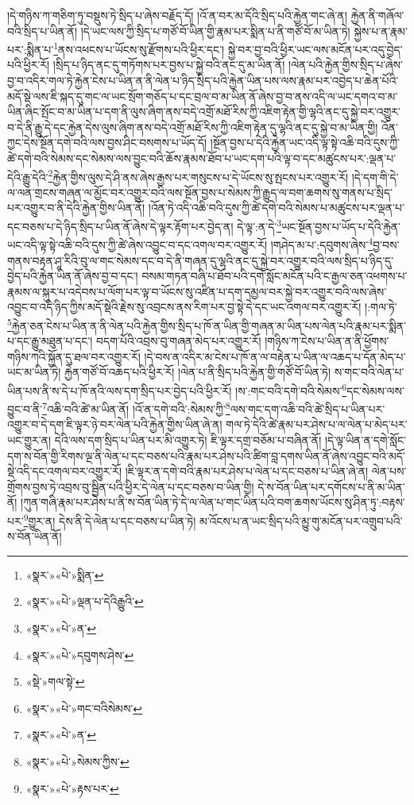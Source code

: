 །དེ་གཉིས་ཀ་གཅིག་ཏུ་བསྡུས་ཏེ་སྲིད་པ་ཞེས་བརྗོད་དོ། །འོ་ན་བར་མ་དོའི་སྲིད་པའི་རྐྱེན་གང་ཞེ་ན། རྐྱེན་ནི་གཞོལ་བའི་སྲིད་པ་ཡིན་ནོ། །དེ་ཡང་ལས་ཀྱི་སྲིད་པ་གཙོ་བོ་ཡིན་གྱི་རྣམ་པར་སྨིན་པ་ནི་གཙོ་བོ་མ་ཡིན་ཏེ། སྐྱེས་པ་ན་རྣམ་པར་:སྨིན་པ་\footnote{«སྣར་»«པེ་»སྨིན་}ནས་འཕངས་པ་ཡོངས་སུ་རྫོགས་པའི་ཕྱིར་དང་། སྐྱེ་བར་བྱ་བའི་ཕྱིར་ཡང་ལས་མངོན་པར་འདུ་བྱེད་པའི་ཕྱིར་རོ། །སྲིད་པ་ཉིད་ནང་དུ་གཏོགས་པར་བྱས་པ་སྐྱེ་བའི་ནང་དུ་མ་ཡིན་ནོ། །ལེན་པའི་རྐྱེན་གྱིས་སྲིད་པ་ཞེས་བྱ་བ་འདིར་གལ་ཏེ་རྐྱེན་ངེས་པ་ཡིན་ན་ནི་ལེན་པ་ཉིད་སྲིད་པའི་རྐྱེན་ཡིན་པས་ལས་རྣམ་པར་འབྱེད་པ་ཆེན་པོའི་མདོ་སྡེ་ལས་ཇི་སྐད་དུ་གང་ལ་ཡང་སྲོག་གཅོད་པ་དང་བྲལ་བ་མ་ཡིན་ནོ་ཞེས་བྱ་བ་ནས་འདི་ལ་ཡང་དགའ་བ་མ་ཡིན་ཞིང་སྤོང་བ་མ་ཡིན་པ་དག་ནི་ལུས་ཞིག་ནས་བདེ་འགྲོ་མཐོ་རིས་ཀྱི་འཇིག་རྟེན་གྱི་ལྷའི་ནང་དུ་སྐྱེ་བར་འགྱུར་བ་དེ་ནི་རྒྱུ་དེ་དང་རྐྱེན་དེས་ལུས་ཞིག་ནས་བདེ་འགྲོ་མཐོ་རིས་ཀྱི་འཇིག་རྟེན་དུ་ལྷའི་ནང་དུ་སྐྱེ་བ་མ་ཡིན་གྱི། འོན་ཀྱང་དེས་སྔོན་དགེ་བའི་ལས་བྱས་ཤིང་བསགས་པ་ཡོད་དོ། །སྔོན་བྱས་པ་དེའི་རྐྱེན་ཡང་འདི་ལྟ་སྟེ་འཆི་བའི་དུས་ཀྱི་ཚེ་དགེ་བའི་སེམས་དང་སེམས་ལས་བྱུང་བའི་ཆོས་རྣམས་ཐོབ་པ་ཡང་དག་པའི་ལྟ་བ་དང་མཚུངས་པར་:ལྡན་པ་དེའི་རྒྱུ་དེའི་\footnote{«སྣར་»«པེ་»ལྡན་པ་དེའིརྒྱུའི་}རྐྱེན་གྱིས་ལུས་དེ་ཤི་ནས་ཞེས་རྒྱས་པར་གསུངས་པ་དེ་ཡོངས་སུ་སྤངས་པར་འགྱུར་རོ། །དེ་དག་གི་དེ་ལ་ལན་གྲངས་གཞན་ལ་མྱོང་བར་འགྱུར་བའི་ལས་སྔོན་བྱས་པ་སེམས་ཀྱི་རྒྱུད་ལ་བག་ཆགས་སུ་གནས་པ་སྲིད་པར་འགྱུར་བ་ནི་དེའི་རྐྱེན་གྱིས་ཡིན་ནོ། །འོན་ཏེ་འདི་འཆི་བའི་དུས་ཀྱི་ཚེ་དགེ་བའི་སེམས་པ་མཚུངས་པར་ལྡན་པ་དང་བཅས་པ་དེ་ཉིད་སྲིད་པ་ཡིན་ནོ་ཞེས་དེ་ལྟར་རྟོག་པར་བྱེད་ན། དེ་ལྟ་:ན་དེ་\footnote{«སྣར་»«པེ་»ན་}ཡང་སྔོན་བྱས་པ་ཡོད་པ་དེའི་རྐྱེན་ཡང་འདི་ལྟ་སྟེ་འཆི་བའི་དུས་ཀྱི་ཚེ་ཞེས་འབྱུང་བ་དང་འགལ་བར་འགྱུར་རོ། །གཤེད་མ་པ་:དབུགས་ཞེས་\footnote{«སྣར་»«པེ་»དབུགས་ཤེས་}བྱ་བས་གནས་བརྟན་ཤཱ་རིའི་བུ་ལ་གང་སེམས་དང་བ་དེ་ནི་གཞན་དུ་ལྷའི་ནང་དུ་སྐྱེ་བར་འགྱུར་བའི་ལས་སྲིད་པ་ཉིད་དུ་བྱེད་པའི་རྐྱེན་ཡིན་ནོ་ཞེས་བྱ་བ་དང་། བསམ་གཏན་བཞི་པ་ཐོབ་པའི་དགེ་སློང་མངོན་པའི་ང་རྒྱལ་ཅན་འཕགས་པ་རྣམས་ལ་སྐུར་པ་འདེབས་པ་ལོག་པར་ལྟ་བ་ཡོངས་སུ་འཛིན་པ་དག་དམྱལ་བར་སྐྱེ་བར་འགྱུར་བའི་ལས་ཞེས་འབྱུང་བ་འདི་ཉིད་ཀྱིས་མདོ་སྡེའི་རྗེས་སུ་འབྲངས་ནས་རིག་པར་བྱ་སྟེ་དེ་དང་ཡང་འགལ་བར་འགྱུར་རོ། །:གལ་ཏེ་\footnote{«སྡེ་»གལ་སྟེ་}རྐྱེན་ཅན་ངེས་པ་ཡིན་ན་ནི་ལེན་པའི་རྐྱེན་གྱིས་སྲིད་པ་ཁོ་ན་ཡིན་གྱི་གཞན་མ་ཡིན་པས་ལེན་པའི་རྣམ་པར་སྨིན་པ་དང་རྒྱུ་མཐུན་པ་དང་། བདག་པོའི་འབྲས་བུ་གཞན་མེད་པར་འགྱུར་རོ། །གཉིས་ཀ་ངེས་པ་ཡིན་ན་ནི་ཕྱོགས་གཉིས་ཀའི་སྐྱོན་དུ་ཐལ་བར་འགྱུར་རོ། །དེ་བས་ན་འདིར་མ་ངེས་པ་ཁོ་ན་ལ་བརྟེན་པ་ཡིན་ལ་འཆད་པ་དོན་མེད་པ་ཡང་མ་ཡིན་ཏེ། རྐྱེན་གཙོ་བོ་འཆད་པའི་ཕྱིར་རོ། །ལེན་པ་ནི་སྲིད་པའི་རྐྱེན་གྱི་གཙོ་བོ་ཡིན་ཏེ། ས་གང་བའི་ལེན་པ་ཡིན་པས་ནི་ས་དེ་པ་ཁོ་ནའི་ལས་དག་སྲིད་པར་བྱེད་པའི་ཕྱིར་རོ། །ས་:གང་བའི་དགེ་བའི་སེམས་\footnote{«སྣར་»«པེ་»གང་བའིསེམས་}དང་སེམས་ལས་བྱུང་བ་ནི་\footnote{«སྣར་»«པེ་»ན་}འཆི་བའི་ཚེ་མ་ཡིན་ནོ། །འོ་ན་དགེ་བའི་:སེམས་ཀྱི་\footnote{«སྣར་»«པེ་»སེམས་ཀྱིས་}ལས་གང་དག་འཆི་བའི་ཚེ་སྲིད་པ་ཡིན་པར་འགྱུར་བ་དེ་དག་ཇི་ལྟར་ཉེ་བར་ལེན་པའི་རྐྱེན་གྱིས་ཡིན་ཞེ་ན། གལ་ཏེ་དེའི་ཚེ་རྣམ་པར་ཤེས་པ་ལ་ལེན་པ་མེད་པར་ཡང་གྱུར་ན། དེའི་ལས་དག་སྲིད་པ་ཡིན་པར་མི་འགྱུར་ཏེ། ཇི་ལྟར་དགྲ་བཅོམ་པ་བཞིན་ནོ། །དེ་ལྟ་ཡིན་ན་དགེ་སློང་དག་ས་བོན་གྱི་རིགས་ལྔ་ནི་ལེན་པ་དང་བཅས་པའི་རྣམ་པར་ཤེས་པའི་ཚིག་བླ་དགས་ཡིན་ནོ་ཞེས་འབྱུང་བའི་མདོ་སྡེ་འདི་དང་འགལ་བར་འགྱུར་རོ། །ཇི་ལྟར་ན་དགེ་བའི་རྣམ་པར་ཤེས་པ་ལེན་པ་དང་བཅས་པ་ཡིན་ཞེ་ན། ལེན་པས་གྲོགས་བྱས་ཏེ་འབྲས་བུ་སྦྱིན་པའི་ཕྱིར་དེ་ལེན་པ་དང་བཅས་བ་ཡིན་གྱི། དེ་ས་བོན་ཡིན་པར་དགོངས་པ་ནི་མ་ཡིན་ནོ། །ཀུན་གཞི་རྣམ་པར་ཤེས་པ་ནི་ས་བོན་ཡིན་ཏེ་དེ་ལ་ལེན་པ་གང་ཡིན་པའི་བག་ཆགས་ཡོངས་སུ་ཤིན་ཏུ་:བརྟས་པར་\footnote{«སྣར་»«པེ་»རྟས་པར་}གྱུར་ན། དེས་ནི་དེ་ལེན་པ་དང་བཅས་པ་ཡིན་ཏེ། མ་འོངས་པ་ན་ཡང་སྲིད་པའི་མྱུ་གུ་མངོན་པར་འགྲུབ་པའི་ས་བོན་ཡིན་ནོ། 